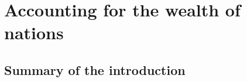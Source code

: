 %
%
%


\chapter{Accounting for the wealth of nations}
\label{chap:acct_for_won}








\section{Summary of the introduction}
\label{sec:intro_summary}

